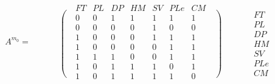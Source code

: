 \begin{equation*}
A^{m_0}=\begin{matrix}\text{ }\\\left.\phantom{\begin{matrix}\mathit{FT}\\\mathit{PL}\\\mathit{DP}\\\mathit{HM}\\\mathit{SV}\\\mathit{PLe}\\\mathit{CM}\end{matrix}}\right(\end{matrix}\begin{matrix}\mathit{FT}&\mathit{PL}&\mathit{DP}&\mathit{HM}&\mathit{SV}&\mathit{PLe}&\mathit{CM}\\0&0&1&1&1&1&1\\0&0&0&0&1&0&0\\1&0&0&0&1&1&1\\1&0&0&0&0&1&1\\1&1&1&0&0&1&1\\1&0&1&1&1&0&1\\1&0&1&1&1&1&0\end{matrix}\begin{matrix}\text{ }\\\left)\phantom{\begin{matrix}\mathit{FT}\\\mathit{PL}\\\mathit{DP}\\\mathit{HM}\\\mathit{SV}\\\mathit{PLe}\\\mathit{CM}\end{matrix}}\right.\end{matrix}\begin{matrix}\text{ }\\\mathit{FT}\\\mathit{PL}\\\mathit{DP}\\\mathit{HM}\\\mathit{SV}\\\mathit{PLe}\\\mathit{CM}\end{matrix}
\end{equation*}

\bigskip

